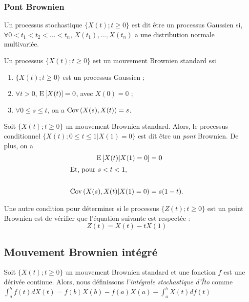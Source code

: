 \documentclass[10pt, french, landscape]{article}
\begin{document}
\begin{multicols*}{2}
\subsubsection*{Pont Brownien}
\begin{definition}
Un processus stochastique $\{X(t) ; t \geq 0 \}$ est dit être un processus Gaussien si, $\forall 0 < t_1 < t_2 < ... < t_n$, $X(t_1), ..., X(t_n)$ a une distribution normale multivariée.
\end{definition}

\begin{definition}
Un processus $\{X(t) ; t \geq 0 \}$ est un mouvement Brownien standard ssi
\begin{enumerate}[label=(\arabic*)]
\item $\{X(t) ; t \geq 0 \}$ est un processus Gaussien ;
\item $\forall t > 0$, $\mathrm{E} \left[ X(t) \right] = 0$, avec $X(0) = 0$ ;
\item $\forall 0 \leq s \leq t$, on a $\mathrm{Cov} \left( X(s), X(t) \right) = s$.
\end{enumerate}
\end{definition}

\begin{definition}
Soit $\{X(t) ; t \geq 0 \}$ un mouvement Brownien standard. Alors, le processus conditionnel $\{X(t) ; 0 \leq t \leq 1 | X(1) = 0 \}$ est dit être un \emph{pont} Brownien.  De plus, on a
\begin{align*}
\mathrm{E} \left[ X(t) | X(1) = 0 \right] & = 0 \\
\shortintertext{Et, pour $s < t < 1$,} \\
\mathrm{Cov} \left( X(s), X(t) | X(1) = 0 \right) & = s(1-t). \\
\end{align*}
\end{definition}
Une autre condition pour déterminer si le processus $\{ Z(t) ; t \geq 0 \}$ est un point Brownien est de vérifier que l'équation suivante est respectée : 
\[Z(t) = X(t) - t X(1) \]

\subsection*{Mouvement Brownien intégré}
\begin{definition}
Soit $\{X(t) ; t \geq 0 \}$ un mouvement Brownien standard et une fonction $f$ est une dérivée continue. Alors, nous définissons \emph{l'intégrale stochastique d'Îto} comme \\
$\int_{a}^{b} f(t) d X(t) = f(b) X(b) - f(a) X(a) - \int_{a}^{b} X(t) d f(t)$
\end{definition}


\end{multicols*}
\end{document}
